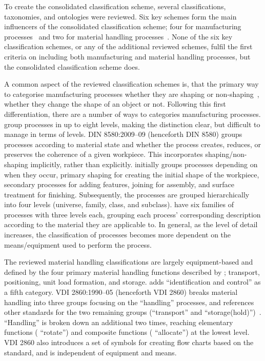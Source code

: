 To create the consolidated classification scheme, several classifications, taxonomies, and ontologies were reviewed.
Six key schemes form the main influencers of the consolidated classification scheme; four for manufacturing processes~\parencite{DIN8580,Ashby2011,Kalpakjian,9780831130497} and two for material handling processes~\parencite{VDI2860,Kay12MHE}.
None of the six key classification schemes, or any of the additional reviewed schemes, fulfil the first criteria on including both manufacturing and material handling processes, but the consolidated classification scheme does.

A common aspect of the reviewed classification schemes is, that the primary way to categorise manufacturing processes whether they are shaping or non-shaping~\parencite{9780831130497,Ashby2011,DIN8580,Kalpakjian}, \ie{} whether they change the shape of an object or not.
Following this first differentiation, there are a number of ways to categories manufacturing processes.
\textcite{9780831130497} group processes in up to eight levels, making the distinction clear, but difficult to manage in terms of levels.
DIN 8580:2009--09 (henceforth DIN 8580) groups processes according to material state and whether the process creates, reduces, or preserves the coherence of a given workpiece.
This incorporates shaping/non-shaping implicitly, rather than explicitly.
\textcite{Ashby2011} initially groups processes depending on when they occur, \ie{} primary shaping for creating the initial shape of the workpiece, secondary processes for adding features, joining for assembly, and surface treatment for finishing.
Subsequently, the processes are grouped hierarchically into four levels (universe, family, class, and subclass).
\textcite{Kalpakjian} have six families of processes with three levels each, grouping each process' corresponding description according to the material they are applicable to.
In general, as the level of detail increases, the classification of processes becomes more dependent on the means/equipment used to perform the process.

The reviewed material handling classifications are largely equipment-based and defined by the four primary material handling functions described by \textcite{578045219951201}; transport, positioning, unit load formation, and storage.
\textcite{Kay12MHE} adds ``identification and control'' as a fifth category.
VDI 2860:1990--05 (henceforth VDI 2860) breaks material handling into three groups focusing on the ``handling'' processes, and references other standards for the two remaining groups (``transport'' and ``storage(hold)'')~\parencite{VDI2860}.
``Handling'' is broken down an additional two times, reaching elementary functions (\eg{} ``rotate'') and composite functions (\eg{} ``allocate'') at the lowest level.
VDI 2860 also introduces a set of symbols for creating flow charts based on the standard, and is independent of equipment and means.

